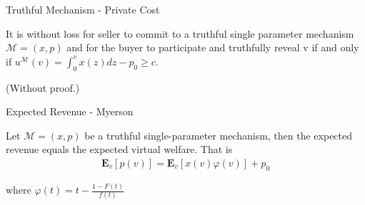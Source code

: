 \documentclass{beamer}
\begin{document}
\begin{frame}{Truthful Mechanism - Private Cost}
  \begin{lemma}
    It is without loss for seller to commit to a truthful single parameter mechanism $\mathcal{M}=(x,p)$ and
    for the buyer to participate and truthfully reveal v if and only if $u^\mathcal{M}(v) = \int_0^v x(z)dz - p_0 \geq c$.
  \end{lemma}
  (Without proof.)
\end{frame}

\begin{frame}{Expected Revenue - Myerson}
  \begin{lemma}
    Let $\mathcal{M}=(x,p)$ be a truthful single-parameter mechanism, then the expected revenue equals the expected virtual welfare. That is
    \begin{align*}
      \mathbf{E}_v\left[p(v)\right]
      = \mathbf{E}_v\left[x(v)\varphi(v)\right] + p_0
    \end{align*}

    where $\varphi(t) = t - \frac{1 - F(t)}{f(t)}$
  \end{lemma}
\end{frame}
\end{document}
